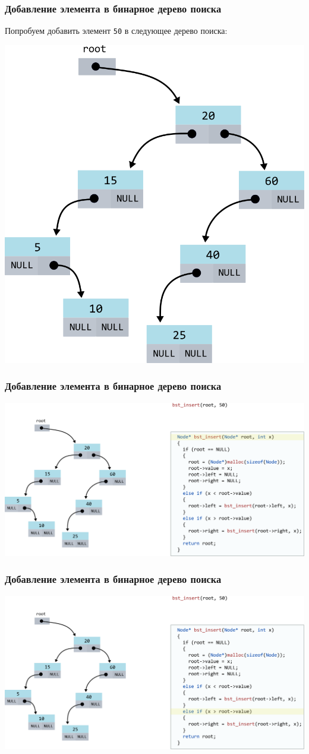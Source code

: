 \documentclass[10pt,pdf,hyperref={unicode}]{beamer}
\begin{document}
\begin{frame}[fragile]
\frametitle{Добавление элемента в бинарное дерево поиска}
Попробуем добавить элемент \texttt{50} в следующее дерево поиска:
\begin{center}
\includegraphics[width=0.5\linewidth]{../images/codetree/codetree0.png}
\end{center}
\end{frame}

\begin{frame}[fragile]
\frametitle{Добавление элемента в бинарное дерево поиска}
\begin{center}
\includegraphics[width=\imageSizeMult\linewidth]{../images/codetree/codetree1.png}
\end{center}
\end{frame}

\begin{frame}[fragile]
\frametitle{Добавление элемента в бинарное дерево поиска}
\begin{center}
\includegraphics[width=\imageSizeMult\linewidth]{../images/codetree/codetree2.png}
\end{center}
\end{frame}
\end{document}
